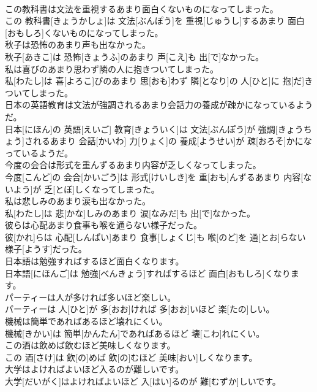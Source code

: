 \documentclass[8pt]{extreport}
\begin{document}
\begin{CJK}{UTF8}{min}
\\	この教科書は文法を重視するあまり面白くないものになってしまった。	
\\	この 教科書[きょうかしょ]は 文法[ぶんぽう]を 重視[じゅうし]するあまり 面白[おもしろ]くないものになってしまった。
\\	秋子は恐怖のあまり声も出なかった。	
\\	秋子[あきこ]は 恐怖[きょうふ]のあまり 声[こえ]も 出[で]なかった。
\\	私は喜びのあまり思わず隣の人に抱きついてしまった。	
\\	私[わたし]は 喜[よろこ]びのあまり 思[おも]わず 隣[となり]の 人[ひと]に 抱[だ]きついてしまった。
\\	日本の英語教育は文法が強調されるあまり会話力の養成が疎かになっているようだ。	
\\	日本[にほん]の 英語[えいご] 教育[きょういく]は 文法[ぶんぽう]が 強調[きょうちょう]されるあまり 会話[かいわ] 力[りょく]の 養成[ようせい]が 疎[おろそ]かになっているようだ。
\\	今度の会合は形式を重んずるあまり内容が乏しくなってしまった。	
\\	今度[こんど]の 会合[かいごう]は 形式[けいしき]を 重[おも]んずるあまり 内容[ないよう]が 乏[とぼ]しくなってしまった。
\\	私は悲しみのあまり涙も出なかった。	
\\	私[わたし]は 悲[かな]しみのあまり 涙[なみだ]も 出[で]なかった。
\\	彼らは心配あまり食事も喉を通らない様子だった。	
\\	彼[かれ]らは 心配[しんぱい]あまり 食事[しょくじ]も 喉[のど]を 通[とお]らない 様子[ようす]だった。
\\	日本語は勉強すればするほど面白くなります。	
\\	日本語[にほんご]は 勉強[べんきょう]すればするほど 面白[おもしろ]くなります。
\\	パーティーは人が多ければ多いほど楽しい。	
\\	パーティーは 人[ひと]が 多[おお]ければ 多[おお]いほど 楽[たの]しい。
\\	機械は簡単であればあるほど壊れにくい。	
\\	機械[きかい]は 簡単[かんたん]であればあるほど 壊[こわ]れにくい。
\\	この酒は飲めば飲むほど美味しくなります。	
\\	この 酒[さけ]は 飲[の]めば 飲[の]むほど 美味[おい]しくなります。
\\	大学はよければよいほど入るのが難しいです。	
\\	大学[だいがく]はよければよいほど 入[はい]るのが 難[むずか]しいです。

\end{CJK}
\end{document}
